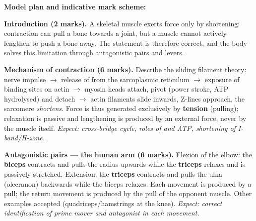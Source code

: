 \documentclass[11pt]{article}
\begin{document}
\begin{corrige}
\textbf{Model plan and indicative mark scheme:}

\textbf{Introduction (2 marks).} A skeletal muscle exerts force only by shortening: contraction can pull a bone towards a joint, but a muscle cannot actively lengthen to push a bone away. The statement is therefore correct, and the body solves this limitation through antagonistic pairs and levers.

\textbf{Mechanism of contraction (6 marks).} Describe the sliding filament theory: nerve impulse $\rightarrow$ release of  from the sarcoplasmic reticulum $\rightarrow$ exposure of binding sites on actin $\rightarrow$ myosin heads attach, pivot (power stroke, ATP hydrolysed) and detach $\rightarrow$ actin filaments slide inwards, Z-lines approach, the sarcomere \emph{shortens}. Force is thus generated exclusively by \textbf{tension} (pulling); relaxation is passive and lengthening is produced by an external force, never by the muscle itself. \emph{Expect: cross-bridge cycle, roles of  and ATP, shortening of I-band/H-zone.}

\textbf{Antagonistic pairs — the human arm (6 marks).} Flexion of the elbow: the \textbf{biceps} contracts and pulls the radius upwards while the \textbf{triceps} relaxes and is passively stretched. Extension: the \textbf{triceps} contracts and pulls the ulna (olecranon) backwards while the biceps relaxes. Each movement is produced by a pull; the return movement is produced by the pull of the opponent muscle. Other examples accepted (quadriceps/hamstrings at the knee). \emph{Expect: correct identification of prime mover and antagonist in each movement.}


\end{corrige}
\end{document}
